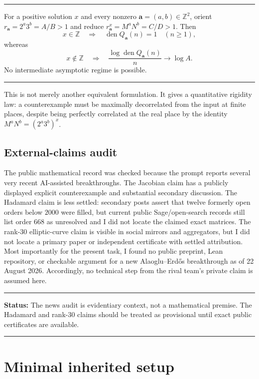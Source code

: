 \documentclass[11pt,oneside]{article}
\theoremstyle{definition}
\theoremstyle{remark}
\newcommand{\Z}{\mathbb Z}
\newcommand{\den}{\operatorname{den}}
\newcommand{\AEconj}{Alaoglu--Erd\H{o}s}
\newenvironment{statusbox}[1]
{\begin{center}\begin{minipage}{0.94\textwidth}\hrule\vspace{0.45em}\textbf{Status:} #1\par\vspace{0.35em}}
{\vspace{0.35em}\hrule\end{minipage}\end{center}}
\newenvironment{resultbox}
{\begin{center}\begin{minipage}{0.94\textwidth}\hrule\vspace{0.5em}}
{\vspace{0.45em}\hrule\end{minipage}\end{center}}
\begin{document}
\begin{resultbox}
For a positive solution $x$ and every nonzero $\mathbf a=(a,b)\in\Z^2$, orient
$r_{\mathbf a}=2^a3^b=A/B>1$ and reduce
$r_{\mathbf a}^{x}=M^aN^b=C/D>1$.  Then
\[
 x\in\Z
 \quad\Longrightarrow\quad
 \den Q_{\mathbf a}(n)=1\quad(n\ge1),
\]
whereas
\[
 x\notin\Z
 \quad\Longrightarrow\quad
 \frac{\log\den Q_{\mathbf a}(n)}{n}\longrightarrow\log A.
\]
No intermediate asymptotic regime is possible.
\end{resultbox}

This is not merely another equivalent formulation.  It gives a quantitative rigidity law:
a counterexample must be maximally decorrelated from the input at finite places, despite
being perfectly correlated at the real place by the identity
$M^aN^b=(2^a3^b)^x$.

\subsection{External-claims audit}

The public mathematical record was checked because the prompt reports several very recent
AI-assisted breakthroughs.  The Jacobian claim has a publicly displayed explicit
counterexample and substantial secondary discussion.  The Hadamard claim is less settled:
secondary posts assert that twelve formerly open orders below $2000$ were filled, but current
public Sage/open-search records still list order $668$ as unresolved and I did not locate the
claimed exact matrices.  The rank-$30$ elliptic-curve claim is visible in social mirrors and
aggregators, but I did not locate a primary paper or independent certificate with settled
attribution.  Most importantly for the present task, I found no public preprint, Lean
repository, or checkable argument for a new \AEconj{} breakthrough as of 22 August 2026.
Accordingly, no technical step from the rival team's private claim is assumed here.

\begin{statusbox}{The news audit is evidentiary context, not a mathematical premise.  The
Hadamard and rank-$30$ claims should be treated as provisional until exact public
certificates are available.}
\end{statusbox}

\section{Minimal inherited setup}
\label{sec:setup}
\end{document}
